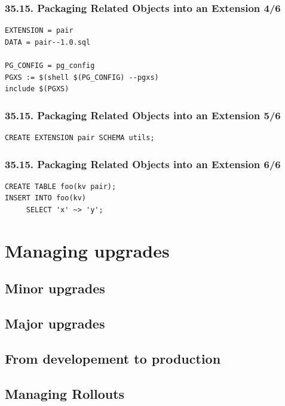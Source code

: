 \documentclass[english]{beamer}
\begin{document}
\begin{frame}[fragile]
  \frametitle{35.15. Packaging Related Objects into an Extension 4/6}

\begin{example}[Makefile]
\begin{verbatim}
EXTENSION = pair
DATA = pair--1.0.sql

PG_CONFIG = pg_config
PGXS := $(shell $(PG_CONFIG) --pgxs)
include $(PGXS)
\end{verbatim}
\end{example}
\end{frame}

\begin{frame}[fragile]
  \frametitle{35.15. Packaging Related Objects into an Extension 5/6}

\begin{example}[psql]
\begin{verbatim}
CREATE EXTENSION pair SCHEMA utils;
\end{verbatim}
\end{example}
\end{frame}

\begin{frame}[fragile]
  \frametitle{35.15. Packaging Related Objects into an Extension 6/6}

\begin{example}[psql]
\begin{verbatim}
CREATE TABLE foo(kv pair);
INSERT INTO foo(kv)
     SELECT 'x' ~> 'y';
\end{verbatim}
\end{example}
\end{frame}

\section{Managing upgrades}

\subsection{Minor upgrades}
\subsection{Major upgrades}
\subsection{From developement to production}
\subsection{Managing Rollouts}
\end{document}
